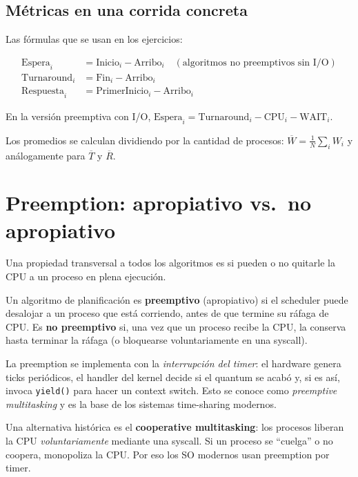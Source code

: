 \documentclass[11pt,a4paper]{article}
\begin{document}
\subsection{Métricas en una corrida concreta}

Las fórmulas que se usan en los ejercicios:

\begin{align*}
\text{Espera}_i      &= \text{Inicio}_i - \text{Arribo}_i \quad (\text{algoritmos no preemptivos sin I/O}) \\
\text{Turnaround}_i  &= \text{Fin}_i - \text{Arribo}_i \\
\text{Respuesta}_i   &= \text{PrimerInicio}_i - \text{Arribo}_i
\end{align*}

En la versión preemptiva con I/O,
$\text{Espera}_i = \text{Turnaround}_i - \text{CPU}_i - \text{WAIT}_i$.

Los promedios se calculan dividiendo por la cantidad de procesos:
$\overline{W} = \frac{1}{N} \sum_i W_i$ y análogamente para
$\overline{T}$ y $\overline{R}$.

\section{Preemption: apropiativo vs.\ no apropiativo}

Una propiedad transversal a todos los algoritmos es si pueden o no
quitarle la CPU a un proceso en plena ejecución.

\begin{definicion}
Un algoritmo de planificación es \textbf{preemptivo} (apropiativo) si
el scheduler puede desalojar a un proceso que está corriendo, antes
de que termine su ráfaga de CPU. Es \textbf{no preemptivo} si, una
vez que un proceso recibe la CPU, la conserva hasta terminar la
ráfaga (o bloquearse voluntariamente en una syscall).
\end{definicion}

La preemption se implementa con la \emph{interrupción del timer}: el
hardware genera ticks periódicos, el handler del kernel decide si el
quantum se acabó y, si es así, invoca \texttt{yield()} para hacer un
context switch. Esto se conoce como \emph{preemptive multitasking} y
es la base de los sistemas time-sharing modernos.

Una alternativa histórica es el \textbf{cooperative multitasking}: los
procesos liberan la CPU \emph{voluntariamente} mediante una syscall.
Si un proceso se ``cuelga'' o no coopera, monopoliza la CPU. Por eso
los SO modernos usan preemption por timer.
\end{document}
